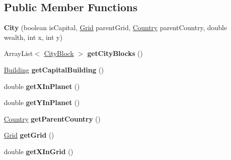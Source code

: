 \subsection*{Public Member Functions}
\begin{DoxyCompactItemize}
\item 
{\bfseries City} (boolean is\+Capital, \hyperlink{classplanets_1_1_grid}{Grid} parent\+Grid, \hyperlink{classplanets_1_1_country}{Country} parent\+Country, double wealth, int x, int y)\hypertarget{classcities_1_1_city_a885fc56162a16b84794f5b2397778ae2}{}\label{classcities_1_1_city_a885fc56162a16b84794f5b2397778ae2}

\item 
Array\+List$<$ \hyperlink{classcities_1_1_city_block}{City\+Block} $>$ {\bfseries get\+City\+Blocks} ()\hypertarget{classcities_1_1_city_a724b8088cb5e6d1f4e21385aa87d8a72}{}\label{classcities_1_1_city_a724b8088cb5e6d1f4e21385aa87d8a72}

\item 
\hyperlink{classbuildings_1_1_building}{Building} {\bfseries get\+Capital\+Building} ()\hypertarget{classcities_1_1_city_ac6be54223390a5b358ff88feeb9cfcaf}{}\label{classcities_1_1_city_ac6be54223390a5b358ff88feeb9cfcaf}

\item 
double {\bfseries get\+X\+In\+Planet} ()\hypertarget{classcities_1_1_city_a264c0c8a4b9775533fbc68cbbda07c45}{}\label{classcities_1_1_city_a264c0c8a4b9775533fbc68cbbda07c45}

\item 
double {\bfseries get\+Y\+In\+Planet} ()\hypertarget{classcities_1_1_city_a3898cbc1196bcda87ea82daad437cc87}{}\label{classcities_1_1_city_a3898cbc1196bcda87ea82daad437cc87}

\item 
\hyperlink{classplanets_1_1_country}{Country} {\bfseries get\+Parent\+Country} ()\hypertarget{classcities_1_1_city_a9ef6db75fe81c1e1ed3b209adeef87aa}{}\label{classcities_1_1_city_a9ef6db75fe81c1e1ed3b209adeef87aa}

\item 
\hyperlink{classplanets_1_1_grid}{Grid} {\bfseries get\+Grid} ()\hypertarget{classcities_1_1_city_a4d4a53de7d3f49b23d1c8e99c1a7bb9e}{}\label{classcities_1_1_city_a4d4a53de7d3f49b23d1c8e99c1a7bb9e}

\item 
double {\bfseries get\+X\+In\+Grid} ()\hypertarget{classcities_1_1_city_a21e1d0d9f9c89a44d6eed23d20792d5a}{}\label{classcities_1_1_city_a21e1d0d9f9c89a44d6eed23d20792d5a}


\end{DoxyCompactItemize}
